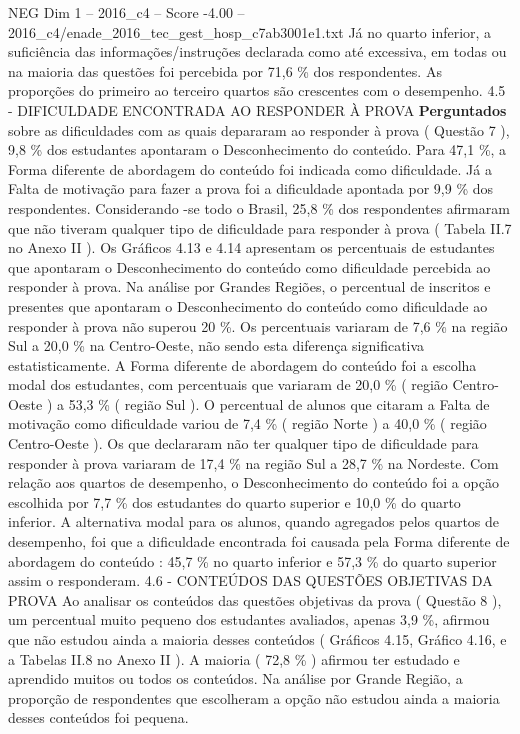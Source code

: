 \begin{textsample}{NEG Dim 1 – 2016\_c4 – Score -4.00 – 2016\_c4/enade\_2016\_tec\_gest\_hosp\_c7ab3001e1.txt}
Já no quarto inferior, a suficiência das informações/instruções declarada como até excessiva, em todas ou na maioria das questões foi percebida por 71,6 \% dos respondentes.
As proporções do primeiro ao terceiro quartos são crescentes com o desempenho. 4.5 - DIFICULDADE ENCONTRADA AO RESPONDER À PROVA \textbf{Perguntados} sobre as dificuldades com as quais depararam ao responder à prova ( Questão 7 ), 9,8 \% dos estudantes apontaram o Desconhecimento do conteúdo.
Para 47,1 \%, a Forma diferente de abordagem do conteúdo foi indicada como dificuldade.
Já a Falta de motivação para fazer a prova foi a dificuldade apontada por 9,9 \% dos respondentes.
Considerando -se todo o Brasil, 25,8 \% dos respondentes afirmaram que não tiveram qualquer tipo de dificuldade para responder à prova ( Tabela II.7 no Anexo II ).
Os Gráficos 4.13 e 4.14 apresentam os percentuais de estudantes que apontaram o Desconhecimento do conteúdo como dificuldade percebida ao responder à prova.
Na análise por Grandes Regiões, o percentual de inscritos e presentes que apontaram o Desconhecimento do conteúdo como dificuldade ao responder à prova não superou 20 \%.
Os percentuais variaram de 7,6 \% na região Sul a 20,0 \% na Centro-Oeste, não sendo esta diferença significativa estatisticamente.
A Forma diferente de abordagem do conteúdo foi a escolha modal dos estudantes, com percentuais que variaram de 20,0 \% ( região Centro-Oeste ) a 53,3 \% ( região Sul ).
O percentual de alunos que citaram a Falta de motivação como dificuldade variou de 7,4 \% ( região Norte ) a 40,0 \% ( região Centro-Oeste ).
Os que declararam não ter qualquer tipo de dificuldade para responder à prova variaram de 17,4 \% na região Sul a 28,7 \% na Nordeste.
Com relação aos quartos de desempenho, o Desconhecimento do conteúdo foi a opção escolhida por 7,7 \% dos estudantes do quarto superior e 10,0 \% do quarto inferior.
A alternativa modal para os alunos, quando agregados pelos quartos de desempenho, foi que a dificuldade encontrada foi causada pela Forma diferente de abordagem do conteúdo : 45,7 \% no quarto inferior e 57,3 \% do quarto superior assim o responderam. 4.6 - CONTEÚDOS DAS QUESTÕES OBJETIVAS DA PROVA Ao analisar os conteúdos das questões objetivas da prova ( Questão 8 ), um percentual muito pequeno dos estudantes avaliados, apenas 3,9 \%, afirmou que não estudou ainda a maioria desses conteúdos ( Gráficos 4.15, Gráfico 4.16, e a Tabelas II.8 no Anexo II ).
A maioria ( 72,8 \% ) afirmou ter estudado e aprendido muitos ou todos os conteúdos.
Na análise por Grande Região, a proporção de respondentes que escolheram a opção não estudou ainda a maioria desses conteúdos foi pequena.

\end{textsample}
